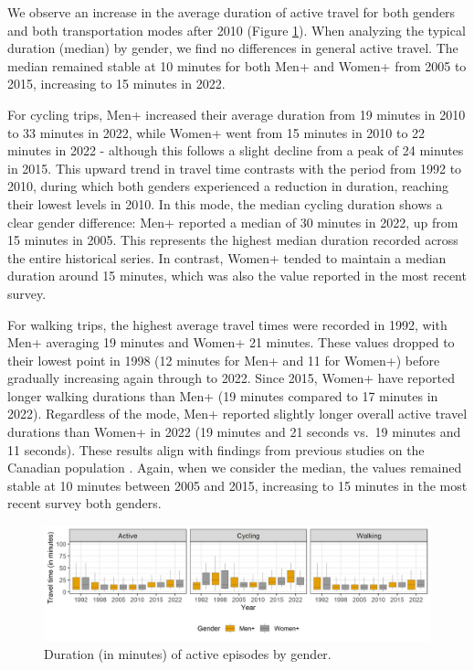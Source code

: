\documentclass[preprint, 3p,
authoryear]{elsarticle} %
\begin{document}
We observe an increase in the average duration of active travel for both
genders and both transportation modes after 2010 (Figure
\ref{fig:gender-dur-figure}). When analyzing the typical duration
(median) by gender, we find no differences in general active travel. The
median remained stable at 10 minutes for both Men+ and Women+ from 2005
to 2015, increasing to 15 minutes in 2022.

For cycling trips, Men+ increased their average duration from 19 minutes
in 2010 to 33 minutes in 2022, while Women+ went from 15 minutes in 2010
to 22 minutes in 2022 - although this follows a slight decline from a
peak of 24 minutes in 2015. This upward trend in travel time contrasts
with the period from 1992 to 2010, during which both genders experienced
a reduction in duration, reaching their lowest levels in 2010. In this
mode, the median cycling duration shows a clear gender difference: Men+
reported a median of 30 minutes in 2022, up from 15 minutes in 2005.
This represents the highest median duration recorded across the entire
historical series. In contrast, Women+ tended to maintain a median
duration around 15 minutes, which was also the value reported in the
most recent survey.

For walking trips, the highest average travel times were recorded in
1992, with Men+ averaging 19 minutes and Women+ 21 minutes. These values
dropped to their lowest point in 1998 (12 minutes for Men+ and 11 for
Women+) before gradually increasing again through to 2022. Since 2015,
Women+ have reported longer walking durations than Men+ (19 minutes
compared to 17 minutes in 2022). Regardless of the mode, Men+ reported
slightly longer overall active travel durations than Women+ in 2022 (19
minutes and 21 seconds vs.~19 minutes and 11 seconds). These results
align with findings from previous studies on the Canadian population
\citep{bryan2009, borhani2024}. Again, when we consider the median, the
values remained stable at 10 minutes between 2005 and 2015, increasing
to 15 minutes in the most recent survey both genders.

\begin{figure}
\includegraphics[width=1\linewidth]{figures/gender_duration_boxplots} \caption{Duration (in minutes) of active episodes by gender.}\label{fig:gender-dur-figure}
\end{figure}
\end{document}
